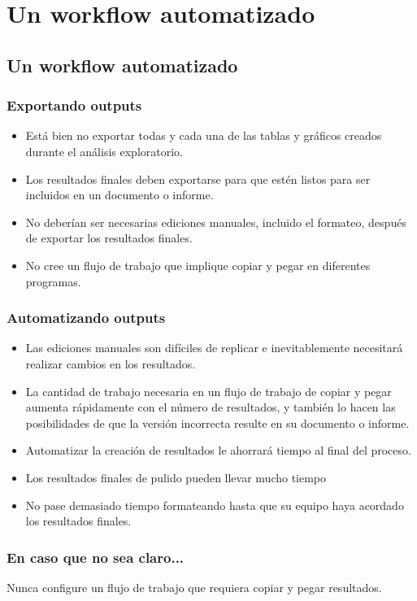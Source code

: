 \documentclass[10pt, aspectratio=169, compress]{beamer}
\begin{document}
\section{Un workflow automatizado}
\subsection{Un workflow automatizado}
\begin{frame}[t]
	\frametitle{Exportando outputs}
	\begin{itemize}
		\item Está bien no exportar todas y cada una de las tablas y gráficos creados durante el análisis exploratorio.
		\item Los resultados finales deben exportarse para que estén listos para ser incluidos en un documento o informe.
		\item No deberían ser necesarias ediciones manuales, incluido el formateo, después de exportar los resultados finales.
		\item No cree un flujo de trabajo que implique copiar y pegar en diferentes programas.
	\end{itemize}
\end{frame}
\begin{frame}[t]
	\frametitle{Automatizando outputs}
	\begin{itemize}
		\item Las ediciones manuales son difíciles de replicar e inevitablemente necesitará realizar cambios en los resultados.
		\item La cantidad de trabajo necesaria en un flujo de trabajo de copiar y pegar aumenta rápidamente con el número de resultados, y también lo hacen las posibilidades de que la versión incorrecta resulte en su documento o informe.
		\item Automatizar la creación de resultados le ahorrará tiempo al final del proceso.
		\item Los resultados finales de pulido pueden llevar mucho tiempo
		\item No pase demasiado tiempo formateando hasta que su equipo haya acordado los resultados finales.
	\end{itemize}
\end{frame}
\begin{frame}
	\frametitle{En caso que no sea claro...}
	
	\begin{center}
		{\LARGE 
		Nunca configure un flujo de trabajo que requiera copiar y pegar resultados.
		}
	\end{center}
\end{frame}
\end{document}
